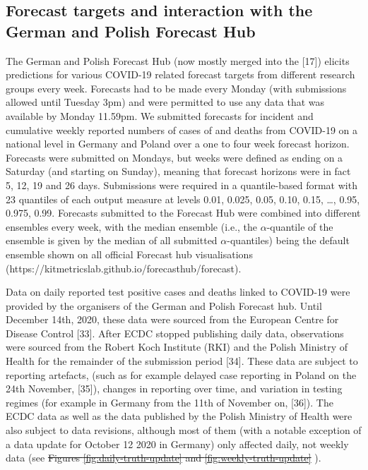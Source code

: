 \documentclass[10pt,letterpaper]{article}
\providecommand{\DIFaddtex}[1]{{\protect\color{blue}\uwave{#1}}} %
\providecommand{\DIFdeltex}[1]{{\protect\color{red}\sout{#1}}}                      %
\providecommand{\DIFaddbegin}{} %
\providecommand{\DIFaddend}{} %
\providecommand{\DIFdelbegin}{} %
\providecommand{\DIFdelend}{} %
\providecommand{\DIFadd}[1]{\texorpdfstring{\DIFaddtex{#1}}{#1}} %
\providecommand{\DIFdel}[1]{\texorpdfstring{\DIFdeltex{#1}}{}} %
\newcommand{\DIFscaledelfig}{0.5}
\newlength{\DIFdelgraphicswidth} %
\newlength{\DIFdelgraphicsheight} %
\newcommand{\DIFaddincludegraphics}[2][]{{\color{blue}\fbox{\DIFOincludegraphics[#1]{#2}}}} %
\newcommand{\DIFdelincludegraphics}[2][]{%
\sbox{\DIFdelgraphicsbox}{\DIFOincludegraphics[#1]{#2}}%
\settoboxwidth{\DIFdelgraphicswidth}{\DIFdelgraphicsbox} %
\settoboxtotalheight{\DIFdelgraphicsheight}{\DIFdelgraphicsbox} %
\scalebox{\DIFscaledelfig}{%
\parbox[b]{\DIFdelgraphicswidth}{\usebox{\DIFdelgraphicsbox}\\[-\baselineskip] \rule{\DIFdelgraphicswidth}{0em}}\llap{\resizebox{\DIFdelgraphicswidth}{\DIFdelgraphicsheight}{%
\setlength{\unitlength}{\DIFdelgraphicswidth}%
\begin{picture}(1,1)%
\thicklines\linethickness{2pt} %
{\color[rgb]{1,0,0}\put(0,0){\framebox(1,1){}}}%
{\color[rgb]{1,0,0}\put(0,0){\line( 1,1){1}}}%
{\color[rgb]{1,0,0}\put(0,1){\line(1,-1){1}}}%
\end{picture}%
}\hspace*{3pt}}} %
} %
\DeclareRobustCommand{\DIFaddbegin}{\DIFOaddbegin \let\includegraphics\DIFaddincludegraphics} %
\DeclareRobustCommand{\DIFaddend}{\DIFOaddend \let\includegraphics\DIFOincludegraphics} %
\DeclareRobustCommand{\DIFdelbegin}{\DIFOdelbegin \let\includegraphics\DIFdelincludegraphics} %
\DeclareRobustCommand{\DIFdelend}{\DIFOaddend \let\includegraphics\DIFOincludegraphics} %
\begin{document}
\hypertarget{forecast-targets-and-interaction-with-the-german-and-polish-forecast-hub}{%
\subsection{Forecast targets and interaction with the German and Polish
Forecast
Hub}\label{forecast-targets-and-interaction-with-the-german-and-polish-forecast-hub}}

The German and Polish Forecast Hub (now mostly merged into the {[}17{]})
elicits predictions for various COVID-19 related forecast targets from
different research groups every week. Forecasts had to be made every
Monday (with submissions allowed until Tuesday 3pm) and were permitted
to use any data that was available by Monday 11.59pm. We submitted
forecasts for incident and cumulative weekly reported numbers of cases
of and deaths from COVID-19 on a national level in Germany and Poland
over a one to four week forecast horizon. Forecasts were submitted on
Mondays, but weeks were defined as ending on a Saturday (and starting on
Sunday), meaning that forecast horizons were in fact 5, 12, 19 and 26
days. Submissions were required in a quantile-based format with 23
quantiles of each output measure at levels 0.01, 0.025, 0.05, 0.10,
0.15, \ldots, 0.95, 0.975, 0.99. Forecasts submitted to the Forecast Hub
were combined into different ensembles every week, with the median
ensemble (i.e., the \(\alpha\)-quantile of the ensemble is given by the
median of all submitted \(\alpha\)-quantiles) being the default ensemble
shown on all official Forecast hub visualisations
(https://kitmetricslab.github.io/forecasthub/forecast).

Data on daily reported test positive cases and deaths linked to COVID-19
were provided by the organisers of the German and Polish Forecast hub.
Until December 14th, 2020, these data were sourced from the European
Centre for Disease Control {[}33{]}. After ECDC stopped publishing daily
data, observations were sourced from the Robert Koch Institute (RKI) and
the Polish Ministry of Health for the remainder of the submission period
{[}34{]}. These data are subject to reporting artefacts, (such as for
example delayed case reporting in Poland on the 24th November,
{[}35{]}), changes in reporting over time, and variation in testing
regimes (for example in Germany from the 11th of November on, {[}36{]}).
The ECDC data as well as the data published by the Polish Ministry of
Health were also subject to data revisions, although most of them (with
a notable exception of a data update for October 12 2020 in Germany)
only affected daily, not weekly data (see \DIFdelbegin \DIFdel{Figures
\ref{fig:daily-truth-update} and \ref{fig:weekly-truth-update}}\DIFdelend \DIFaddbegin \DIFadd{Figs
} \DIFadd{and }\DIFaddend ).
\end{document}

